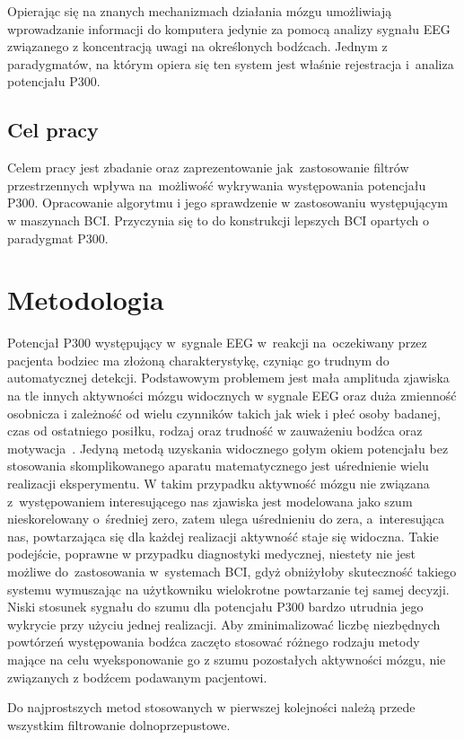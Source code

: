 \documentclass[licencjacka,openright]{pracamgr}
\begin{document}
Opierając się na znanych mechanizmach działania mózgu umożliwiają wprowadzanie informacji do komputera jedynie za pomocą analizy sygnału EEG związanego z koncentracją uwagi na określonych bodźcach. Jednym z paradygmatów, na którym opiera się ten system jest właśnie rejestracja i~analiza potencjału P300.

\section{Cel pracy}
Celem pracy jest zbadanie oraz zaprezentowanie jak~zastosowanie filtrów przestrzennych wpływa na~możliwość wykrywania występowania potencjału P300. Opracowanie
algorytmu i jego sprawdzenie w zastosowaniu występującym w maszynach BCI. Przyczynia się to do konstrukcji lepszych BCI opartych o paradygmat P300.

\chapter{Metodologia}
Potencjał P300 występujący w~sygnale EEG w~reakcji na~oczekiwany przez pacjenta bodziec ma złożoną charakterystykę, czyniąc go trudnym do automatycznej detekcji. Podstawowym problemem jest mała amplituda zjawiska na tle innych aktywności mózgu widocznych w sygnale EEG oraz duża zmienność osobnicza i zależność od wielu czynników takich jak wiek i płeć osoby badanej, czas od ostatniego posiłku, rodzaj oraz trudność w zauważeniu bodźca oraz motywacja~\citep{chudzik2004}.
Jedyną metodą uzyskania widocznego gołym okiem potencjału bez stosowania skomplikowanego aparatu matematycznego jest uśrednienie wielu realizacji eksperymentu. W takim przypadku aktywność mózgu nie związana z~występowaniem interesującego nas zjawiska jest modelowana jako szum nieskorelowany o~średniej zero, zatem ulega uśrednieniu do zera, a~interesująca nas, powtarzająca się dla każdej realizacji aktywność staje się widoczna. Takie podejście, poprawne w przypadku diagnostyki medycznej, niestety nie jest możliwe do~zastosowania w~systemach BCI, gdyż obniżyłoby skuteczność takiego systemu wymuszając na użytkowniku wielokrotne powtarzanie tej samej decyzji. Niski stosunek sygnału do szumu dla potencjału P300 bardzo utrudnia jego wykrycie przy użyciu jednej realizacji. Aby zminimalizować liczbę niezbędnych powtórzeń występowania bodźca zaczęto stosować różnego rodzaju metody mające na celu wyeksponowanie go z szumu pozostałych aktywności mózgu, nie związanych z bodźcem podawanym pacjentowi.

Do najprostszych metod stosowanych w pierwszej kolejności należą przede wszystkim filtrowanie dolnoprzepustowe.
\end{document}
